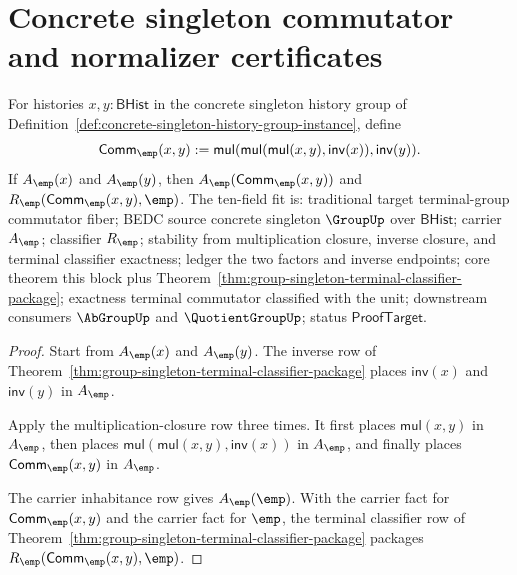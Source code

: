 \section{Concrete singleton commutator and normalizer certificates}

\begin{theorem}
\label{thm:group-singleton-commutator-terminal-collapse}
For histories $x,y:\mathsf{BHist}$ in the concrete singleton history group of
Definition~\ref{def:concrete-singleton-history-group-instance}, define
$$
\mathsf{Comm}_{\emp}(x,y):=
\mathsf{mul}(\mathsf{mul}(\mathsf{mul}(x,y),\mathsf{inv}(x)),\mathsf{inv}(y)).
$$
If $A_{\emp}(x)$ and $A_{\emp}(y)$, then
$A_{\emp}(\mathsf{Comm}_{\emp}(x,y))$ and
$R_{\emp}(\mathsf{Comm}_{\emp}(x,y),\emp)$.
The ten-field fit is: traditional target terminal-group commutator fiber; BEDC
source concrete singleton $\GroupUp$ over $\mathsf{BHist}$; carrier
$A_{\emp}$; classifier $R_{\emp}$; stability from multiplication closure,
inverse closure, and terminal classifier exactness; ledger the two factors and
inverse endpoints; core theorem this block plus
Theorem~\ref{thm:group-singleton-terminal-classifier-package}; exactness
terminal commutator classified with the unit; downstream consumers
$\AbGroupUp$ and $\QuotientGroupUp$; status $\mathsf{ProofTarget}$.
\end{theorem}
\begin{proof}
Start from $A_{\emp}(x)$ and $A_{\emp}(y)$. The inverse row of
Theorem~\ref{thm:group-singleton-terminal-classifier-package} places
$\mathsf{inv}(x)$ and $\mathsf{inv}(y)$ in $A_{\emp}$.

Apply the multiplication-closure row three times. It first places
$\mathsf{mul}(x,y)$ in $A_{\emp}$, then places
$\mathsf{mul}(\mathsf{mul}(x,y),\mathsf{inv}(x))$ in $A_{\emp}$, and finally
places $\mathsf{Comm}_{\emp}(x,y)$ in $A_{\emp}$.

The carrier inhabitance row gives $A_{\emp}(\emp)$. With the carrier fact for
$\mathsf{Comm}_{\emp}(x,y)$ and the carrier fact for $\emp$, the terminal
classifier row of Theorem~\ref{thm:group-singleton-terminal-classifier-package}
packages $R_{\emp}(\mathsf{Comm}_{\emp}(x,y),\emp)$.
\end{proof}

